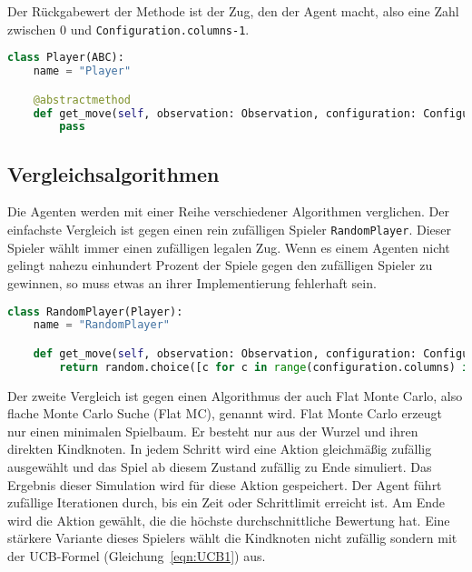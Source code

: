 Der Rückgabewert der Methode ist der Zug, den der Agent macht, also eine Zahl zwischen 0 und \verb|Configuration.columns-1|.

\begin{lstlisting}[language=Python,caption=Die Basisklasse aller Agenten.,label={lst:baseplayer}]
class Player(ABC):
    name = "Player"

    @abstractmethod
    def get_move(self, observation: Observation, configuration: Configuration) -> int:
        pass
\end{lstlisting}

\subsection{Vergleichsalgorithmen}
\label{chap:vergleiche-impl}

Die Agenten werden mit einer Reihe verschiedener Algorithmen verglichen.
Der einfachste Vergleich ist gegen einen rein zufälligen Spieler \verb|RandomPlayer|.
Dieser Spieler wählt immer einen zufälligen legalen Zug.
Wenn es einem Agenten nicht gelingt nahezu einhundert Prozent der Spiele gegen den zufälligen Spieler zu gewinnen, so muss etwas an ihrer Implementierung fehlerhaft sein.

\begin{lstlisting}[language=Python,caption=Ein Spieler der zufällige Züge wählt.,label={lst:randomplayer}]
class RandomPlayer(Player):
    name = "RandomPlayer"

    def get_move(self, observation: Observation, configuration: Configuration) -> int:
        return random.choice([c for c in range(configuration.columns) if observation.board[c] == 0])
\end{lstlisting}

Der zweite Vergleich ist gegen einen Algorithmus der auch Flat Monte Carlo, also flache Monte Carlo Suche (Flat MC), genannt wird.
Flat Monte Carlo erzeugt nur einen minimalen Spielbaum.
Er besteht nur aus der Wurzel und ihren direkten Kindknoten.
In jedem Schritt wird eine Aktion gleichmäßig zufällig ausgewählt und das Spiel ab diesem Zustand zufällig zu Ende simuliert.
Das Ergebnis dieser Simulation wird für diese Aktion gespeichert.
Der Agent führt zufällige Iterationen durch, bis ein Zeit oder Schrittlimit erreicht ist.
Am Ende wird die Aktion gewählt, die die höchste durchschnittliche Bewertung hat.
Eine stärkere Variante dieses Spielers wählt die Kindknoten nicht zufällig sondern mit der UCB-Formel (Gleichung~\ref{eqn:UCB1}) aus.

